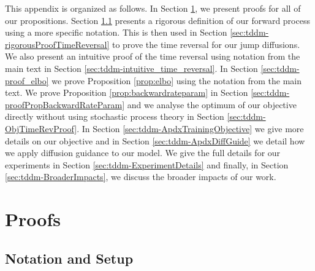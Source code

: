 This appendix is organized as follows.  In Section \ref{sec:tddm-Proofs}, we present proofs for all of our propositions. Section \ref{sec:tddm-notation} presents a rigorous definition of our forward process using a more specific notation. This is then used in Section \ref{sec:tddm-rigorousProofTimeReversal} to prove the time reversal for our jump diffusions. We also present an intuitive proof of the time reversal using notation from the main text in Section \ref{sec:tddm-intuitive_time_reversal}. In Section \ref{sec:tddm-proof_elbo} we prove Proposition \ref{prop:elbo} using the notation from the main text. We prove Proposition \ref{prop:backwardrateparam} in Section \ref{sec:tddm-proofPropBackwardRateParam} and we analyse the optimum of our objective directly without using stochastic process theory in Section \ref{sec:tddm-ObjTimeRevProof}. In Section \ref{sec:tddm-ApdxTrainingObjective} we give more details on our objective and in Section \ref{sec:tddm-ApdxDiffGuide} we detail how we apply diffusion guidance to our model. We give the full details for our experiments in Section \ref{sec:tddm-ExperimentDetails} and finally, in Section \ref{sec:tddm-BroaderImpacts}, we discuss the broader impacts of our work.

\section{Proofs}
\label{sec:tddm-Proofs}

\subsection{Notation and Setup}
\label{sec:tddm-notation}

\def \msb {\mathsf{B}}
\newcommand{\expeLigne}[1]{\mathbb{E}[#1]}
\newcommand{\CPELigne}[2]{\mathbb{E}[#1 \ | \ #2]}
\newcommand{\coint}[1]{[ #1 )}
\newcommand{\ccint}[1]{[ #1 ]}
\newcommand{\ooint}[1]{( #1 )}
\def \Jbb{\mathbb{J}}
\def \Pbb{\mathbb{P}}
\def \Kbb{\mathbb{K}}
\def \rmd{\mathrm{d}}
\def \msp{\mathsf{P}}
\def \Jker{\mathbb{J}}
\newcommand{\abs}[1]{|#1|}
\def \msd{\mathsf{D}}
\def \calA{\mathcal{A}}
\def \calR{\mathcal{R}}
\def \rset{\mathbb{R}}
\def \msx{\mathsf{X}}
\def \mcx{\mathcal{X}}
\def \nset{\mathbb{N}}
\def \dim{\mathrm{dim}}
\def \rmc{\mathrm{C}}
\newcommand{\normLigne}[1]{\| #1 \|}
\def \bfX{\mathbf{X}}
\def \bfY{\mathbf{Y}}
\def \Pker{\mathrm{P}}
\def \Qker{\mathrm{Q}}
\def \Jker{\mathrm{J}}
\newcommand{\condprobaLigne}[2]{\mathbb{P}(#1 \ | \ #2)}
\def \msa{\mathsf{A}}

